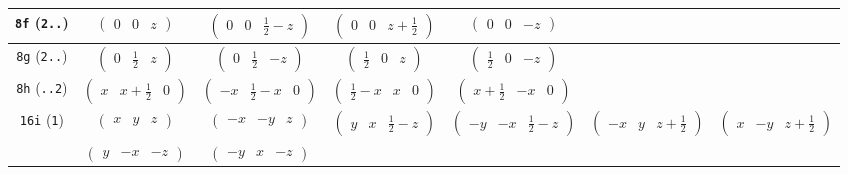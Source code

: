 \documentclass[fleqn,9pt,landscape]{jsarticle}
\begin{document}
\begin{center}
\begin{longtable}{ccccccc}
{\tt 8f} ({\tt 2..}) & $ \begin{pmatrix} 0 & 0 & z \end{pmatrix} $ & $ \begin{pmatrix} 0 & 0 & \frac{1}{2} - z \end{pmatrix} $ & $ \begin{pmatrix} 0 & 0 & z + \frac{1}{2} \end{pmatrix} $ & $ \begin{pmatrix} 0 & 0 & - z \end{pmatrix} $ & $  $ & $  $ \\ \hline
{\tt 8g} ({\tt 2..}) & $ \begin{pmatrix} 0 & \frac{1}{2} & z \end{pmatrix} $ & $ \begin{pmatrix} 0 & \frac{1}{2} & - z \end{pmatrix} $ & $ \begin{pmatrix} \frac{1}{2} & 0 & z \end{pmatrix} $ & $ \begin{pmatrix} \frac{1}{2} & 0 & - z \end{pmatrix} $ & $  $ & $  $ \\ \hline
{\tt 8h} ({\tt ..2}) & $ \begin{pmatrix} x & x + \frac{1}{2} & 0 \end{pmatrix} $ & $ \begin{pmatrix} - x & \frac{1}{2} - x & 0 \end{pmatrix} $ & $ \begin{pmatrix} \frac{1}{2} - x & x & 0 \end{pmatrix} $ & $ \begin{pmatrix} x + \frac{1}{2} & - x & 0 \end{pmatrix} $ & $  $ & $  $ \\ \hline
{\tt 16i} ({\tt 1}) & $ \begin{pmatrix} x & y & z \end{pmatrix} $ & $ \begin{pmatrix} - x & - y & z \end{pmatrix} $ & $ \begin{pmatrix} y & x & \frac{1}{2} - z \end{pmatrix} $ & $ \begin{pmatrix} - y & - x & \frac{1}{2} - z \end{pmatrix} $ & $ \begin{pmatrix} - x & y & z + \frac{1}{2} \end{pmatrix} $ & $ \begin{pmatrix} x & - y & z + \frac{1}{2} \end{pmatrix} $ \\
& $ \begin{pmatrix} y & - x & - z \end{pmatrix} $ & $ \begin{pmatrix} - y & x & - z \end{pmatrix} $ & $  $ & $  $ & $  $ & $  $ \\
\end{longtable}
\end{center}
\end{document}
